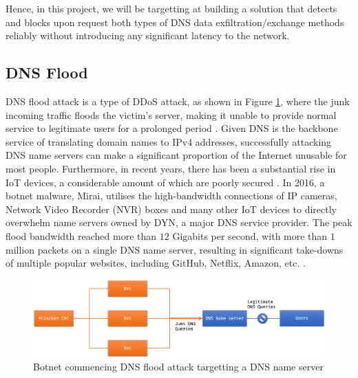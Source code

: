 \documentclass[a4paper]{report}
\begin{document}
Hence, in this project, we will be targetting at building a solution that detects and blocks upon request both types of DNS data exfiltration/exchange methods reliably without introducing any significant latency to the network.

\subsection{DNS Flood}
\label{section:background-dnsflood}

DNS flood attack is a type of DDoS attack, as shown in Figure \ref{fig:dns-flood}, where the junk incoming traffic floods the victim's server, making it unable to provide normal service to legitimate users for a prolonged period \cite{cloudflare-dns-flood}. Given DNS is the backbone service of translating domain names to IPv4 addresses, successfully attacking DNS name servers can make a significant proportion of the Internet unusable for most people. Furthermore, in recent years, there has been a substantial rise in IoT devices, a considerable amount of which are poorly secured \cite{mahjabin-2019}. In 2016, a botnet malware, Mirai\cite{bisson-2016}, utilises the high-bandwidth connections of IP cameras, Network Video Recorder (NVR) boxes and many other IoT devices to directly overwhelm name servers owned by DYN, a major DNS service provider. The peak flood bandwidth reached more than $12$ Gigabits per second, with more than $1$ million packets on a single DNS name server, resulting in significant take-downs of multiple popular websites, including GitHub, Netflix, Amazon, etc. \cite{bisson-2016, akamai-dns-flood}.

\begin{figure}[h!]
  \includegraphics[width=\textwidth]{imgs/dns-flood.png}
  \caption{Botnet commencing DNS flood attack targetting a DNS name server}
  \label{fig:dns-flood}
\end{figure}
\end{document}
